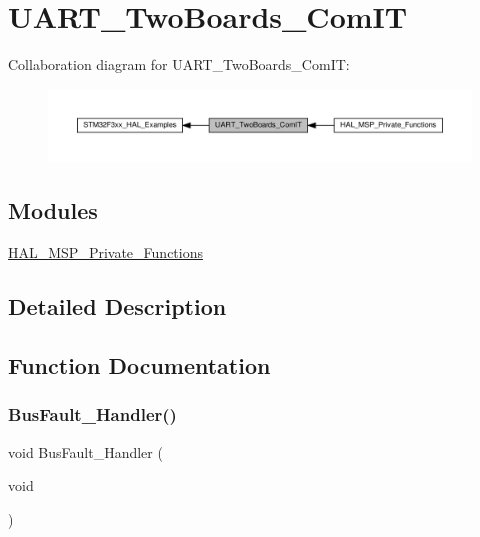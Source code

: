\hypertarget{group__UART__TwoBoards__ComIT}{}\section{U\+A\+R\+T\+\_\+\+Two\+Boards\+\_\+\+Com\+IT}
\label{group__UART__TwoBoards__ComIT}
Collaboration diagram for U\+A\+R\+T\+\_\+\+Two\+Boards\+\_\+\+Com\+IT\+:\nopagebreak
\begin{figure}[H]
\begin{center}
\leavevmode
\includegraphics[width=350pt]{group__UART__TwoBoards__ComIT}
\end{center}
\end{figure}
\subsection*{Modules}
\begin{DoxyCompactItemize}
\item 
\hyperlink{group__HAL__MSP__Private__Functions}{H\+A\+L\+\_\+\+M\+S\+P\+\_\+\+Private\+\_\+\+Functions}
\end{DoxyCompactItemize}


\subsection{Detailed Description}


\subsection{Function Documentation}
\mbox{\label{group__UART__TwoBoards__ComIT_ga2c27fc382a40cb4b92f9a48b327ab79f}} 
\subsubsection{\texorpdfstring{Bus\+Fault\+\_\+\+Handler()}{BusFault\_Handler()}}
{\footnotesize\ttfamily void Bus\+Fault\+\_\+\+Handler (\begin{DoxyParamCaption}\item[{void}]{ }\end{DoxyParamCaption})}



